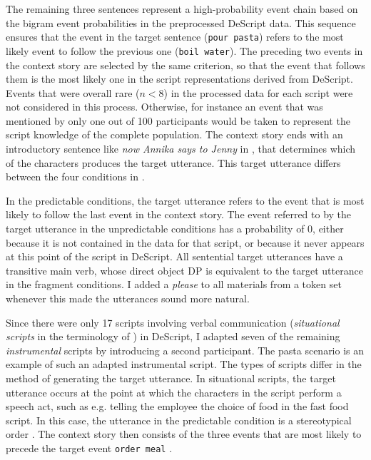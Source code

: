%
The remaining three sentences represent a high-probability event chain based on the bigram event probabilities in the preprocessed DeScript data. This sequence ensures that the event in the target sentence \Last[a] (\texttt{pour pasta}) refers to the most likely event to follow the previous one (\texttt{boil water}). The preceding two events in the context story are selected by the same criterion, so that the event that follows them is the most likely one in the script representations derived from DeScript. Events that were overall rare ($n < 8$) in the processed data for each script were not considered in this process. Otherwise, for instance an event that was mentioned by only one out of 100 participants would be taken to represent the script knowledge of the complete population. The context story ends with an introductory sentence like \textit{now Annika says to Jenny} in \Last, that determines which of the characters produces the target utterance. This target utterance differs between the four conditions in \Last[a--d].

In the predictable conditions, the target utterance refers to the event that is most likely to follow the last event in the context story. The event referred to by the target utterance in the unpredictable conditions has a probability of 0, either because it is not contained in the data for that script, or because it never appears at this point of the script in DeScript. All sentential target utterances have a transitive main verb, whose direct object DP is equivalent to the target utterance in the fragment conditions. I added a \textit{please} to all materials from a token set whenever this made the utterances sound more natural.

Since there were only 17 scripts involving verbal communication (\textit{situational scripts} in the terminology of \citet{schank.abelson1977}) in DeScript, I adapted seven of the remaining \textit{instrumental} scripts by introducing a second participant. The pasta scenario is an example of such an adapted instrumental script. The types of scripts differ in the method of generating the target utterance. In situational scripts, the target utterance occurs at the point at which the characters in the script perform a speech act, such as e.g. telling the employee the choice of food in the fast food script. In this case, the utterance in the predictable condition is a stereotypical order \Next. The context story then consists of the three events that are most likely to precede the target event \texttt{order meal} \NNext.

